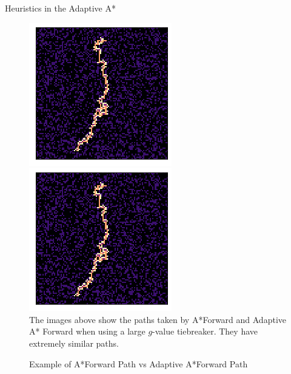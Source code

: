 \documentclass[12pt]{article}
\theoremstyle{definition}
\begin{document}
\begin{onehalfspacing}
\begin{section}{Heuristics in the Adaptive A*}
\begin{figure}[h]
\caption{Example of A*Forward Path vs Adaptive A*Forward Path}
\includegraphics[scale=.5]{images/Forwards1.png}
\includegraphics[scale=.5]{images/Adaptive1.png}\\
The images above show the paths taken by A*Forward and Adaptive A* Forward when using a large $g$-value tiebreaker. They have extremely similar paths.
\end{figure}

\end{section}



\end{onehalfspacing}
\end{document}
